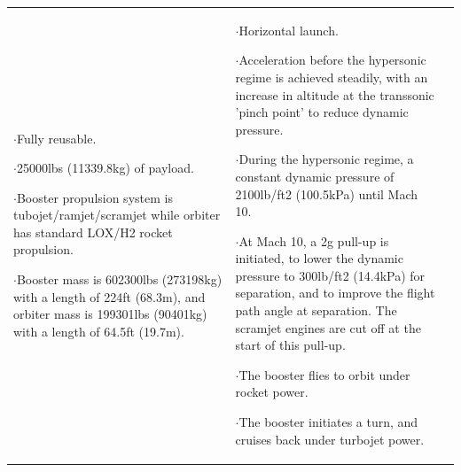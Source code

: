 {\begin{landscape}
\begin{xltabular}{\linewidth}{|X|X|X|}
	$\cdot$Fully reusable.
	
	$\cdot$25000lbs (11339.8kg) of payload.
	
	$\cdot$Booster propulsion system is tubojet/ramjet/scramjet while orbiter has standard LOX/H2 rocket propulsion. 
	
	$\cdot$Booster mass is 602300lbs (273198kg) with a length of 224ft (68.3m), and orbiter mass is 199301lbs (90401kg) with a length of 64.5ft (19.7m).
	
	&\small
	
	$\cdot$Horizontal launch.
	
	$\cdot$Acceleration before the hypersonic regime is achieved steadily, with an increase in altitude at the transsonic 'pinch point' to reduce dynamic pressure. 
	
	$\cdot$During the hypersonic regime, a constant dynamic pressure of 2100lb/ft2 (100.5kPa) until Mach 10.
	
	$\cdot$At Mach 10, a 2g pull-up is initiated, to lower the dynamic pressure to 300lb/ft2 (14.4kPa) for separation, and to improve the flight path angle at separation. The scramjet engines are cut off at the start of this pull-up.  
	
	$\cdot$The booster flies to orbit under rocket power. 
	
	$\cdot$The booster initiates a turn, and cruises back under turbojet power. 
	

\end{xltabular}
\end{landscape}}
